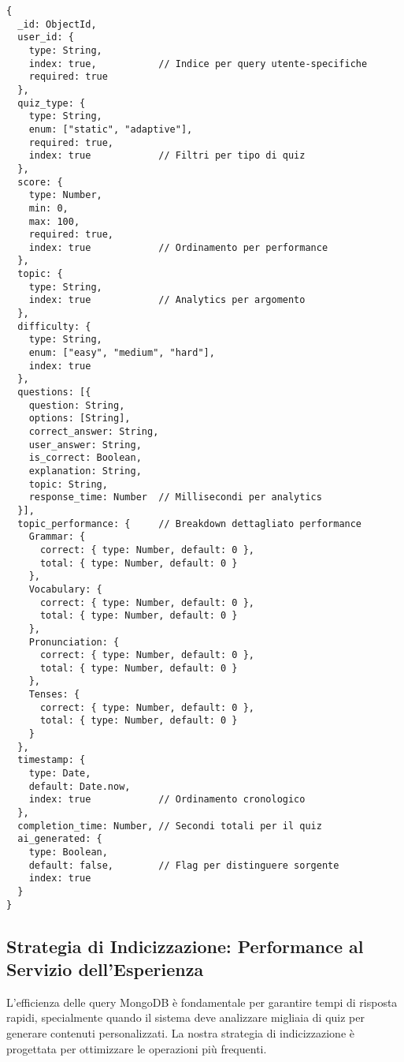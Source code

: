 \documentclass[12pt,a4paper]{article}
\begin{document}
\begin{lstlisting}[style=mongostyle, caption=Schema Avanzato della Quizzes Collection]
{
  _id: ObjectId,
  user_id: {
    type: String,
    index: true,           // Indice per query utente-specifiche
    required: true
  },
  quiz_type: {
    type: String,
    enum: ["static", "adaptive"],
    required: true,
    index: true            // Filtri per tipo di quiz
  },
  score: {
    type: Number,
    min: 0,
    max: 100,
    required: true,
    index: true            // Ordinamento per performance
  },
  topic: {
    type: String,
    index: true            // Analytics per argomento
  },
  difficulty: {
    type: String,
    enum: ["easy", "medium", "hard"],
    index: true
  },
  questions: [{
    question: String,
    options: [String],
    correct_answer: String,
    user_answer: String,
    is_correct: Boolean,
    explanation: String,
    topic: String,
    response_time: Number  // Millisecondi per analytics
  }],
  topic_performance: {     // Breakdown dettagliato performance
    Grammar: { 
      correct: { type: Number, default: 0 },
      total: { type: Number, default: 0 }
    },
    Vocabulary: { 
      correct: { type: Number, default: 0 },
      total: { type: Number, default: 0 }
    },
    Pronunciation: { 
      correct: { type: Number, default: 0 },
      total: { type: Number, default: 0 }
    },
    Tenses: { 
      correct: { type: Number, default: 0 },
      total: { type: Number, default: 0 }
    }
  },
  timestamp: {
    type: Date,
    default: Date.now,
    index: true            // Ordinamento cronologico
  },
  completion_time: Number, // Secondi totali per il quiz
  ai_generated: {
    type: Boolean,
    default: false,        // Flag per distinguere sorgente
    index: true
  }
}
\end{lstlisting}

\subsection{Strategia di Indicizzazione: Performance al Servizio dell'Esperienza}
\label{subsec:indexing-strategy}

L'efficienza delle query MongoDB è fondamentale per garantire tempi di risposta rapidi, specialmente quando il sistema deve analizzare migliaia di quiz per generare contenuti personalizzati. La nostra strategia di indicizzazione è progettata per ottimizzare le operazioni più frequenti.
\end{document}

